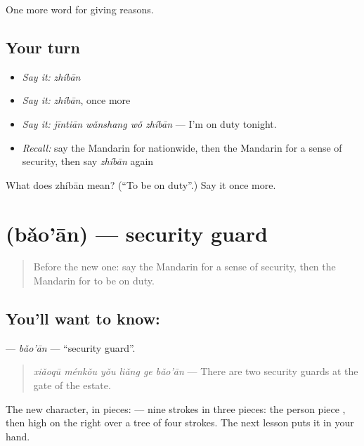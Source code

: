 \begin{grammarlens}[title={What you've built}]
One more word for giving reasons.
\end{grammarlens}

\subsection*{Your turn}
\begin{itemize}
\raggedright
  \item \emph{Say it:} \emph{zhíbān}
  \item \emph{Say it:} \emph{zhíbān}, once more
  \item \emph{Say it:} \emph{jīntiān wǎnshang wǒ zhíbān} — I'm on duty tonight.
  \item \emph{Recall:} say the Mandarin for nationwide, then the Mandarin for a sense of security, then say \emph{zhíbān} again
\end{itemize}

\begin{tcolorbox}[breakable,colback=teal!4,colframe=teal!35!black,title={Before you move on}]
What does zhíbān mean? (\textquotedblleft{}To be on duty\textquotedblright{}.) Say it once more.
\end{tcolorbox}
\section[\texorpdfstring{\zh{保安} (bǎo'ān)}{保安 (bǎo'ān)}]{ (bǎo'ān) — security guard}

\label{lesson:ZH-C382-baoan}



\begin{quote}
Before the new one: say the Mandarin for a sense of security, then the Mandarin for to be on duty.
\end{quote}

\subsection*{You'll want to know: }
\textbf{} — \emph{bǎo'ān} — \textquotedblleft{}security guard\textquotedblright{}.

\begin{quote}
\textbf{} \emph{xiǎoqū ménkǒu yǒu liǎng ge bǎo'ān} — There are two security guards at the gate of the estate.
\end{quote}

The new character, in pieces:  — nine strokes in three pieces: the person piece , then  high on the right over a tree of four strokes. The next lesson puts it in your hand.

